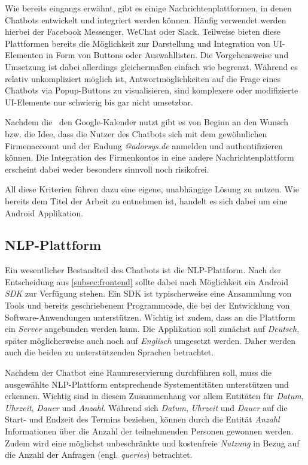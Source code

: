 Wie bereits eingangs erwähnt, gibt es einige Nachrichtenplattformen, in denen Chatbots entwickelt und integriert werden können. Häufig verwendet werden hierbei der Facebook Messenger, WeChat oder Slack. Teilweise bieten diese Plattformen bereits die Möglichkeit zur Darstellung und Integration von \ac{UI}-Elementen in Form von Buttons oder Auswahllisten. Die Vorgehensweise und Umsetzung ist dabei allerdings gleichermaßen einfach wie begrenzt. Während es relativ unkompliziert möglich ist, Antwortmöglichkeiten auf die Frage eines Chatbots via Popup-Buttons zu visualisieren, sind komplexere oder modifizierte \ac{UI}-Elemente nur schwierig bis gar nicht \mbox{umsetzbar}. 

Nachdem die \adorsys \, den Google-Kalender nutzt gibt es von Beginn an den Wunsch bzw. die Idee, dass die Nutzer des Chatbots sich mit dem gewöhnlichen Firmenaccount und der Endung \textit{@adorsys.de} anmelden und authentifizieren können. Die Integration des Firmenkontos in eine andere Nachrichtenplattform erscheint dabei weder besonders sinnvoll noch risikofrei. 

All diese Kriterien führen dazu eine eigene, unabhängige Lösung zu nutzen. Wie bereits dem Titel der Arbeit zu entnehmen ist, handelt es sich dabei um eine Android Applikation. 

\subsection{NLP-Plattform}
\label{subsec:nlp-plattform}

Ein wesentlicher Bestandteil des Chatbots ist die \ac{NLP}-Plattform. Nach der Entscheidung aus \ref{subsec:frontend} sollte dabei nach Möglichkeit ein Android \textit{\ac{SDK}} zur Verfügung stehen. Ein \ac{SDK} ist typischerweise eine Ansammlung von Tools und bereits geschriebenem Programmcode, die bei der Entwicklung von Software-Anwendungen unterstützen. Wichtig ist zudem, dass an die Plattform ein \textit{Server} angebunden werden kann. Die Applikation soll zunächst auf \textit{Deutsch}, später möglicherweise auch noch auf \textit{Englisch} umgesetzt werden. Daher werden auch die beiden zu unterstützenden Sprachen \mbox{betrachtet}. 

Nachdem der Chatbot eine Raumreservierung durchführen soll, muss die ausgewählte \ac{NLP}-Plattform entsprechende Systementitäten unterstützen und erkennen. Wichtig sind in diesem Zusammenhang vor allem Entitäten für \textit{Datum}, \textit{Uhrzeit}, \textit{Dauer} und \textit{Anzahl}. Während sich \textit{Datum}, \textit{Uhrzeit} und \textit{Dauer} auf die Start- und Endzeit des Termins beziehen, können durch die Entität \textit{Anzahl} Informationen über die Anzahl der teilnehmenden Personen gewonnen werden. Zudem wird eine möglichst unbeschränkte und kostenfreie \textit{Nutzung} in Bezug auf die Anzahl der Anfragen (engl. \textit{queries}) \mbox{betrachtet}. 

